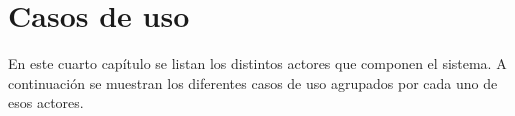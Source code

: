 \chapter{Casos de uso}
\noindent
En este cuarto capítulo se listan los distintos actores que componen el sistema. A continuación se muestran los diferentes casos de uso agrupados por cada uno de esos actores.



